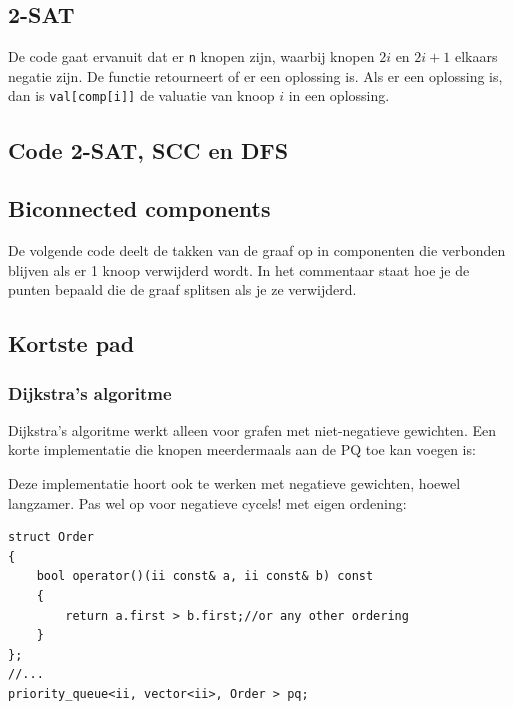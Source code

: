 \documentclass[10pt,a4paper,titlepage]{article}
\begin{document}
\subsection{2-SAT}

De code gaat ervanuit dat er \lstinline{n} knopen zijn, waarbij knopen $2i$ en $2i+1$ elkaars negatie zijn. De functie retourneert of er een oplossing is. Als er een oplossing is, dan is \lstinline{val[comp[i]]} de valuatie van knoop $i$ in een oplossing.

\subsection{Code 2-SAT, SCC en DFS}







\subsection{Biconnected components}

De volgende code deelt de takken van de graaf op in componenten die verbonden blijven als er 1 knoop verwijderd wordt. In het commentaar staat hoe je de punten bepaald die de graaf splitsen als je ze verwijderd.



\subsection{Kortste pad}

\subsubsection{Dijkstra's algoritme}

Dijkstra's algoritme werkt alleen voor grafen met niet-negatieve gewichten.
%
Een korte implementatie die knopen meerdermaals aan de PQ toe kan voegen is:

Deze implementatie hoort ook te werken met negatieve gewichten, hoewel langzamer. Pas wel op voor negatieve cycels!
met eigen ordening:
\begin{lstlisting}
struct Order
{
    bool operator()(ii const& a, ii const& b) const
    {
        return a.first > b.first;//or any other ordering
    }
};
//...
priority_queue<ii, vector<ii>, Order > pq;
\end{lstlisting}
\end{document}
